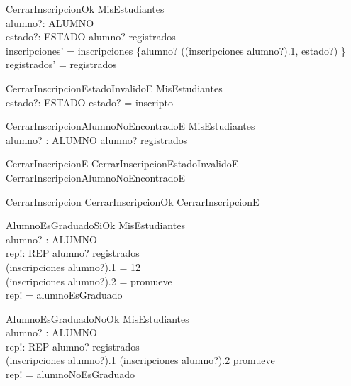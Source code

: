 \begin{schema}{CerrarInscripcionOk}
    \Delta MisEstudiantes \\
    alumno?: ALUMNO \\
    estado?: ESTADO
    \where
    alumno? \in registrados \\
    inscripciones' = inscripciones \oplus \{alumno? \mapsto ((inscripciones alumno?).1, estado?) \} \\
    registrados' = registrados
\end{schema}

\begin{schema}{CerrarInscripcionEstadoInvalidoE}
    \Xi MisEstudiantes \\
    estado?: ESTADO
    \where
    estado? = inscripto
\end{schema}

\begin{schema}{CerrarInscripcionAlumnoNoEncontradoE}
    \Xi MisEstudiantes \\
    alumno? : ALUMNO
    \where
    alumno? \notin registrados
\end{schema}

\begin{zed}
    CerrarInscripcionE  CerrarInscripcionEstadoInvalidoE \lor CerrarInscripcionAlumnoNoEncontradoE
\end{zed}
\begin{zed}
    CerrarInscripcion  CerrarInscripcionOk \lor CerrarInscripcionE
\end{zed}

\begin{schema}{AlumnoEsGraduadoSiOk}
    \Xi MisEstudiantes \\
    alumno? : ALUMNO \\
    rep!: REP
    \where
    alumno? \in registrados \\
    (inscripciones alumno?).1 = 12 \\
    (inscripciones alumno?).2 = promueve \\
    rep! = alumnoEsGraduado
\end{schema}

\begin{schema}{AlumnoEsGraduadoNoOk}
    \Xi MisEstudiantes \\
    alumno? : ALUMNO \\
    rep!: REP
    \where
    alumno? \in registrados \\
    (inscripciones alumno?).1  \lor (inscripciones alumno?).2 \neq promueve \\
    rep! = alumnoNoEsGraduado
\end{schema}

